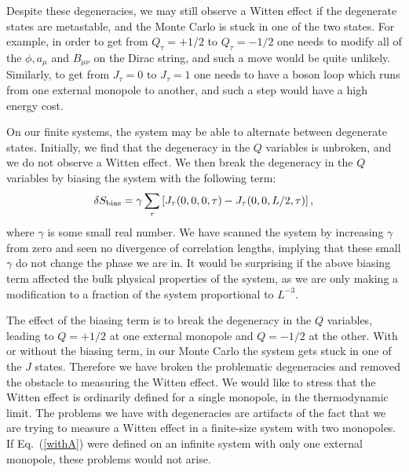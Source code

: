 \documentclass[prb,twocolumn]{revtex4-1}
\begin{document}
Despite these degeneracies, we may still observe a Witten effect if the degenerate states are metastable, and the Monte Carlo is stuck in one of the two states. For example, in order to get from $Q_\tau=+1/2$ to $Q_\tau=-1/2$ one needs to modify all of the $\phi, a_\mu$ and $B_{\mu\nu}$ on the Dirac string, and such a move would be quite unlikely. Similarly, to get from $J_\tau=0$ to $J_\tau=1$ one needs to have a boson loop which runs from one external monopole to another, and such a step would have a high energy cost. 

On our finite systems, the system may be able to alternate between degenerate states. Initially, we find that the degeneracy in the $Q$ variables is unbroken, and we do not observe a Witten effect. We then break the degeneracy in the $Q$ variables by biasing the system with the following term:
\begin{equation}
\delta S_{\rm bias}=\gamma  \sum_{\tau}\left[J_\tau(0,0,0,\tau)-J_\tau(0,0,L/2,\tau)\right],
\label{bias}
\end{equation}
where $\gamma$ is some small real number. We have scanned the system by increasing $\gamma$ from zero and seen no divergence of correlation lengths, implying that these small $\gamma$ do not change the phase we are in. It would be surprising if the above biasing term affected the bulk physical properties of the system, as we are only making a modification to a fraction of the system proportional to $L^{-3}$. 

The effect of the biasing term is to break the degeneracy in the $Q$ variables, leading to $Q=+1/2$ at one external monopole and $Q=-1/2$ at the other. With or without the biasing term, in our Monte Carlo the system gets stuck in one of the $J$ states. Therefore we have broken the problematic degeneracies and removed the obstacle to measuring the Witten effect. We would like to stress that the Witten effect is ordinarily defined for a single monopole, in the thermodynamic limit. The problems we have with degeneracies are artifacts of the fact that we are trying to measure a Witten effect in a finite-size system with two monopoles. If Eq.~(\ref{withA}) were defined on an infinite system with only one external monopole, these problems would not arise.
\end{document}
